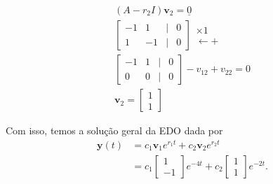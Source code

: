 \begin{resol}
  \begin{gather}
    (A-r_2I)\pmb{v}_2 = \underline{0} \\
    \begin{bmatrix}
      -1 & 1 & | & 0\\
      1 & -1 & | & 0
    \end{bmatrix}
    \begin{matrix}
      \times 1 \\
      \leftarrow +
    \end{matrix}\\
    \begin{bmatrix}
      -1 & 1 & | & 0\\
      0 & 0 & | & 0
    \end{bmatrix}
    -v_{12}+v_{22}=0\\
    \pmb{v}_2 =
    \begin{bmatrix}
      1\\
      1
    \end{bmatrix}
  \end{gather}

  Com isso, temos a solução geral da EDO dada por
  \begin{align}
    \pmb{y}(t) &= c_1\pmb{v}_1e^{r_1t} + c_2\pmb{v}_2e^{r_2t} \\
    &= c_1
    \begin{bmatrix}
      1 \\
      -1
    \end{bmatrix}e^{-4t} + c_2
    \begin{bmatrix}
      1 \\
      1
    \end{bmatrix}e^{-2t}.
  \end{align}


\end{resol}
